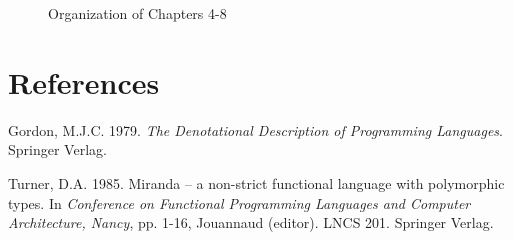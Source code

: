 \begin{figure}[H]
    \centering


    \caption{\textsf Organization of Chapters 4-8}
\end{figure}

\section*{References}

\begin{references}
    \item Gordon, M.J.C. 1979. \textit{The Denotational Description of Programming Languages}. Springer Verlag.
    \item Turner, D.A. 1985. Miranda -- a non-strict functional language with polymorphic types. In \textit{Conference on Functional Programming Languages and Computer Architecture, Nancy}, pp. 1-16, Jouannaud (editor). LNCS 201. Springer Verlag.
\end{references}
